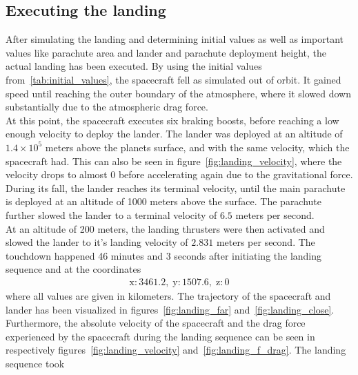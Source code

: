 \documentclass[reprint,english,notitlepage]{revtex4-2}
\begin{document}
\subsection{Executing the landing}\label{subsec:executing-the-landing}
    After simulating the landing and determining initial values as well as important values like parachute area and lander and parachute deployment height, the actual landing has been executed.
    By using the initial values from~\ref{tab:initial_values}, the spacecraft fell as simulated out of orbit.
    It gained speed until reaching the outer boundary of the atmosphere, where it slowed down substantially due to the atmospheric drag force.\\
    At this point, the spacecraft executes six braking boosts, before reaching a low enough velocity to deploy the lander.
    The lander was deployed at an altitude of $1.4 \times 10^5$ meters above the planets surface, and with the same velocity, which the spacecraft had.
    This can also be seen in figure~\ref{fig:landing_velocity}, where the velocity drops to almost 0 before accelerating again due to the gravitational force.\\
    During its fall, the lander reaches its terminal velocity, until the main parachute is deployed at an altitude of 1000 meters above the surface.
    The parachute further slowed the lander to a terminal velocity of $6.5$ meters per second.\\
    At an altitude of 200 meters, the landing thrusters were then activated and slowed the lander to it's landing velocity of $2.831$ meters per second.
    The touchdown happened 46 minutes and 3 seconds after initiating the landing sequence and at the coordinates
    \begin{align*}
    \text{x}: 3461.2, \;\text{y}: 1507.6, \;\text{z}: 0
    \end{align*}
    where all values are given in kilometers.
    The trajectory of the spacecraft and lander has been visualized in figures~\ref{fig:landing_far} and~\ref{fig:landing_close}.
    Furthermore, the absolute velocity of the spacecraft and the drag force experienced by the spacecraft during the landing sequence can be seen in respectively figures~\ref{fig:landing_velocity} and~\ref{fig:landing_f_drag}.
    The landing sequence took
\end{document}
